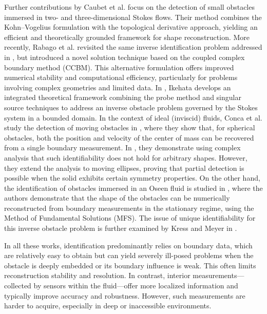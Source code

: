 \documentclass[a4paper,12pt,reqno,natbib]{amsart}
\begin{document}
Further contributions by Caubet et al. \cite{CaubetIP2012,CaubetIPI2016} focus on the detection of small obstacles immersed in two- and three-dimensional Stokes flows. Their method combines the Kohn--Vogelius formulation with the topological derivative approach, yielding an efficient and theoretically grounded framework for shape reconstruction. More recently, Rabago et al. \cite{rabago2025detecting} revisited the same inverse identification problem addressed in \cite{CaubetIP2012,CaubetIPI2016}, but introduced a novel solution technique based on the coupled complex boundary method (CCBM). This alternative formulation offers improved numerical stability and computational efficiency, particularly for problems involving complex geometries and limited data. In \cite{ikehata2025integrating}, Ikehata develops an integrated theoretical framework combining the probe method and singular source techniques to address an inverse obstacle problem governed by the Stokes system in a bounded domain. In the context of ideal (inviscid) fluids, Conca et al. study the detection of moving obstacles in \cite{conca2008detecting14}, where they show that, for spherical obstacles, both the position and velocity of the center of mass can be recovered from a single boundary measurement. In \cite{conca2010detection14}, they demonstrate using complex analysis that such identifiability does not hold for arbitrary shapes. However, they extend the analysis to moving ellipses, proving that partial detection is possible when the solid exhibits certain symmetry properties. 
On the other hand, the identification of obstacles immersed in an Oseen fluid is studied in \cite{karageorghis2020identification14}, where the authors demonstrate that the shape of the obstacles can be numerically reconstructed from boundary measurements in the stationary regime, using the Method of Fundamental Solutions (MFS). The issue of unique identifiability for this inverse obstacle problem is further examined by Kress and Meyer in \cite{kress2000inverse14}. 











In all these works, identification predominantly relies on boundary data, which are relatively easy to obtain but can yield severely ill-posed problems when the obstacle is deeply embedded or its boundary influence is weak. This often limits reconstruction stability and resolution. In contrast, interior measurements—collected by sensors within the fluid—offer more localized information and typically improve accuracy and robustness. However, such measurements are harder to acquire, especially in deep or inaccessible environments.
\end{document}

